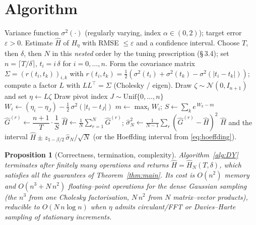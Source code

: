 \documentclass{amsart}
\newtheorem{proposition}{Proposition}
\theoremstyle{definition}
\begin{document}
\section{Algorithm}

\begin{algorithm}[h]
\caption{Stable Monte Carlo estimator of the generalized Pickands constant $H_\eta$}
\label{alg:DY}
\begin{algorithmic}[1]
  \Require Variance function $\sigma^2(\cdot)$ (regularly varying, index $\alpha\in(0,2)$);
           target error $\varepsilon>0$.
  \Ensure Estimate $\widehat H$ of $H_\eta$ with RMSE $\le\varepsilon$ and a
           confidence interval.
  \State Choose $T$, then $\delta$, then $N$ in this \emph{nested} order by the
         tuning prescription (\S\,3.4); set $n=\lceil T/\delta\rceil$,
         $t_i=i\,\delta$ for $i=0,\dots,n$.
  \State Form the covariance matrix $\Sigma=(r(t_i,t_k))_{i,k}$ with
         $r(t_i,t_k)=\tfrac12(\sigma^2(t_i)+\sigma^2(t_k)-\sigma^2(|t_i-t_k|))$;
         compute a factor $L$ with $LL^\top=\Sigma$ (Cholesky / eigen).
     \State Draw $\zeta\sim\mathcal N(0,I_{n+1})$ and set $\eta\gets L\zeta$
     \State Draw pivot index $J\sim\mathrm{Unif}\{0,\dots,n\}$
        \State $W_i \gets (\eta_i-\eta_J)-\tfrac12\,\sigma^2(|t_i-t_J|)$
     \EndFor
     \State $m\gets\max_i W_i$;\quad
            $S\gets\sum_{k} e^{\,W_k-m}$
     \State $\widehat G^{(r)}\gets \dfrac{n+1}{T}\cdot\dfrac{1}{S}$
            \Comment{$=\frac{n+1}{T}\,\frac{\max_i e^{W_i}}{\sum_k e^{W_k}}\in(0,\frac{n+1}{T}]$}
  \EndFor
  \State $\widehat H\gets\frac1N\sum_{r=1}^N\widehat G^{(r)}$;\quad
         $\widehat\sigma_N^2\gets\frac1{N-1}\sum_{r}(\widehat G^{(r)}-\widehat H)^2$
  \State \Return $\widehat H$ and the interval
         $\widehat H\pm z_{1-\beta/2}\,\widehat\sigma_N/\sqrt N$
         \big(or the Hoeffding interval from \eqref{eq:hoeffding}\big).
\end{algorithmic}
\end{algorithm}

\begin{proposition}[Correctness, termination, complexity]\label{prop:alg}
Algorithm~\ref{alg:DY} terminates after finitely many operations and returns
$\widehat H=\widehat H_N(T,\delta)$, which satisfies all the guarantees of
Theorem~\ref{thm:main}. Its cost is $O(n^2)$ memory and
$O(n^3+N\,n^2)$ floating--point operations for the dense Gaussian sampling
(the $n^3$ from one Cholesky factorisation, $N\,n^2$ from $N$ matrix--vector
products), reducible to $O(N\,n\log n)$ when $\eta$ admits circulant/FFT or
Davies--Harte sampling of stationary increments.
\end{proposition}
\end{document}
